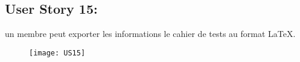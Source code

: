 \newpage
\subsection{User Story 15:}
un membre peut exporter les informations le cahier de tests au format \LaTeX{}.


\begin{figure}[!h]
  \begin{center}
        \texttt{[image: US15]}
        \label{US15-dia}
  \end{center}
\end{figure}